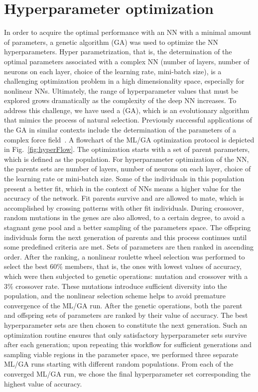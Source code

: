 \documentclass[showpacs,showkeys,preprint,prd,nofootinbib,linenumbers,12pt,superscriptaddress]{revtex4-1}
\begin{document}
\section{Hyperparameter optimization}
In order to acquire the optimal performance with an NN with a minimal amount of parameters, a genetic algorithm (GA) was used to optimize the NN hyperparameters. Hyper parametrization, that is, the determination of the optimal parameters associated with a complex NN (number of layers, number of neurons on each layer, choice of the learning rate, mini-batch size), is a challenging optimization problem in a high dimensionality space, especially for nonlinear NNs. Ultimately, the range of hyperparameter values that must be explored grows dramatically as the complexity of the deep NN increases. To address this challenge, we have used a (GA), which is an evolutionary algorithm that mimics the process of natural selection. Previously successful applications of the GA in similar contexts include the determination of the parameters of a complex force field~\cite{doi:10.1021/acs.jctc.7b00521,doi:10.1021/acs.jctc.6b00432}. 
A flowchart of the ML/GA optimization protocol is depicted in Fig.~\ref{fig:hyperFlow}. The optimization starts with a set of parent parameters, which is defined as the population. For hyperparameter optimization of the NN, the parents sets are number of layers, number of neurons on each layer, choice of the learning rate or mini-batch size. Some of the individuals in this population present a better fit, which in the context of NNs means a higher value for the accuracy of the network. Fit parents survive and are allowed to mate, which is accomplished by crossing patterns with other fit individuals. During crossover, random mutations in the genes are also allowed, to a certain degree, to avoid a stagnant gene pool and a better sampling of the parameters space. The offspring individuals form the next generation of parents and this process continues until some predefined criteria are met. Sets of parameters are then ranked in ascending order. After the ranking, a nonlinear roulette wheel selection\cite{DBLP:journals/corr/abs-1109-3627} was performed to select the best 60\% members, that is, the ones with lowest values of accuracy, which were then subjected to genetic operations: mutation and crossover with a 3\% crossover rate. These mutations introduce sufficient diversity into the population, and the nonlinear selection scheme helps to avoid premature convergence of the ML/GA run. After the genetic operations, both the parent and offspring sets of parameters are ranked by their value of accuracy. The best hyperparameter sets are then chosen to constitute the next generation. Such an optimization routine ensures that only satisfactory hyperparameter sets survive after each generation; upon repeating this workflow for sufficient generations and sampling viable regions in the parameter space, we performed three separate ML/GA runs starting with different random populations. From each of the converged ML/GA run, we chose the final hyperparameter set corresponding the highest value of accuracy. 
\end{document}
